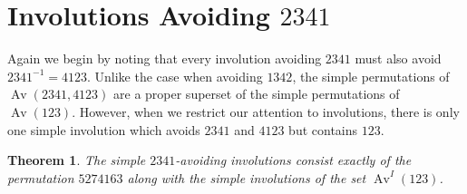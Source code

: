 \documentclass[10pt]{article}
\theoremstyle{plain}
\newtheorem{theorem}{Theorem}[section]
\newcommand{\Av}{\operatorname{Av}}
\begin{document}
\section{Involutions Avoiding $2341$}
\label{sec-2341}

Again we begin by noting that every involution avoiding $2341$ must also avoid $2341^{-1}=4123$. Unlike the case when avoiding $1342$, the simple permutations of $\Av(2341,4123)$ are a proper superset of the simple permutations of $\Av(123)$. However, when we restrict our attention to involutions, there is only one simple involution which avoids $2341$ and $4123$ but contains $123$.

\begin{theorem}
\label{thm-2341-simple-involutions}
The simple $2341$-avoiding involutions consist exactly of the permutation $5274163$ along with the simple involutions of the set $\Av^I(123)$.
\end{theorem}
\end{document}
